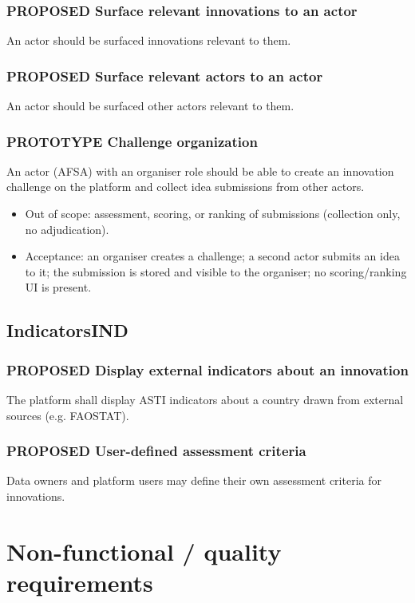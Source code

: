 \documentclass{scrartcl}
\begin{document}
\subsubsection{{\bfseries\sffamily PROPOSED} Surface relevant innovations to an actor}
\label{sec:org257be6d}
An actor should be surfaced innovations relevant to them.
\subsubsection{{\bfseries\sffamily PROPOSED} Surface relevant actors to an actor}
\label{sec:org05263b9}
An actor should be surfaced other actors relevant to them.
\subsubsection{{\bfseries\sffamily PROTOTYPE} Challenge organization}
\label{sec:orgd903d72}
An actor (AFSA) with an organiser role should be able to create an innovation challenge on the platform and collect idea submissions from other actors.
\begin{itemize}
\item Out of scope: assessment, scoring, or ranking of submissions (collection only, no adjudication).
\item Acceptance: an organiser creates a challenge; a second actor submits an idea to it; the submission is stored and visible to the organiser; no scoring/ranking UI is present.
\end{itemize}
\subsection{Indicators\hfill{}\textsc{IND}}
\label{sec:org03f81bd}
\subsubsection{{\bfseries\sffamily PROPOSED} Display external indicators about an innovation}
\label{sec:org1024cbc}
The platform shall display ASTI indicators about a country drawn from external sources (e.g. FAOSTAT).
\subsubsection{{\bfseries\sffamily PROPOSED} User-defined assessment criteria}
\label{sec:org460bd6e}
Data owners and platform users may define their own assessment criteria for innovations.
\section{Non-functional / quality requirements}
\label{sec:org711fe02}
\end{document}
